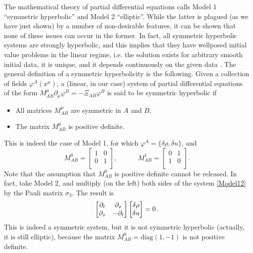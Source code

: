 \documentclass[a4paper, amsfonts, amssymb, amsmath, reprint, showkeys, nofootinbib, twoside, onecolumn,notitlepage]{revtex4-1}
\newcommand{\spc}{\quad \quad \quad}
\begin{document}
The mathematical theory of partial differential equations calls Model 1 ``symmetric hyperbolic'' and Model 2 ``elliptic''. While the latter is plagued (as we have just shown) by a number of non-desirable features, it can be shown that none of these issues can occur in the former. In fact, all symmetric hyperbolic systems are strongly hyperbolic, and this implies that they have wellposed initial value problems in the linear regime, i.e. the solution exists for arbitrary smooth initial data, it is unique, and it depends continuously on the given data \cite{Kato2009}. The general definition of a symmetric hyperbolicity is the following. Given a collection of fields $\varphi^A(x^\mu)$, a (linear, in our case) system of partial differential equations of the form $M^\mu_{AB}\partial_\mu \varphi^B =-\Xi_{AB}\varphi^B$ is said to be symmetric hyperbolic if
\begin{itemize}
\item All matrices $M^\mu_{AB}$ are symmetric in $A$ and $B$;
\item The matrix $M^0_{AB}$ is positive definite.
\end{itemize}
This is indeed the case of Model 1, for which $\varphi^A=\{\delta \rho, \delta u \}$,  and 
\begin{equation}
M^0_{AB} =
\begin{bmatrix}
1 & 0 \\
0 & 1 \\
\end{bmatrix} ,
\spc 
M^1_{AB} =
\begin{bmatrix}
0 & 1 \\
1 & 0 \\
\end{bmatrix} .
\end{equation}  
Note that the assumption that $M^0_{AB}$ is positive definite cannot be released. In fact, take Model 2, and multiply (on the left) both sides of the system \eqref{Model12} by the Pauli matrix $\sigma_3$. The result is
\begin{equation}
\begin{bmatrix}
\partial_t & \partial_x \\
\partial_x & -\partial_t \\
\end{bmatrix}
\begin{bmatrix}
\delta \rho \\
\delta u \\
\end{bmatrix} =0 \, .\\
\end{equation}
This is indeed a symmetric system, but it is not symmetric hyperbolic (actually, it is still elliptic), because the matrix $M^0_{AB}=\text{diag}(1,-1)$ is not positive definite. 
\end{document}

